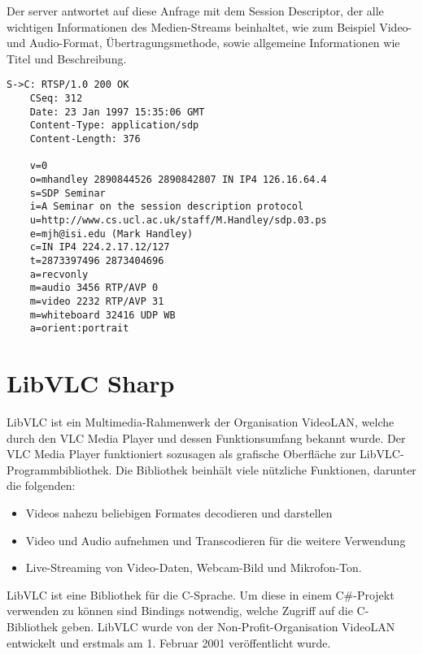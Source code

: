 Der server antwortet auf diese Anfrage mit dem Session Descriptor, der alle wichtigen Informationen des Medien-Streams beinhaltet, wie zum Beispiel Video- und Audio-Format, Übertragungsmethode, sowie allgemeine Informationen wie Titel und Beschreibung.
\begin{lstlisting}
S->C: RTSP/1.0 200 OK
    CSeq: 312
    Date: 23 Jan 1997 15:35:06 GMT
    Content-Type: application/sdp
    Content-Length: 376

    v=0
    o=mhandley 2890844526 2890842807 IN IP4 126.16.64.4
    s=SDP Seminar
    i=A Seminar on the session description protocol
    u=http://www.cs.ucl.ac.uk/staff/M.Handley/sdp.03.ps
    e=mjh@isi.edu (Mark Handley)
    c=IN IP4 224.2.17.12/127
    t=2873397496 2873404696
    a=recvonly
    m=audio 3456 RTP/AVP 0
    m=video 2232 RTP/AVP 31
    m=whiteboard 32416 UDP WB
    a=orient:portrait
\end{lstlisting}

\section{LibVLC Sharp}

LibVLC ist ein Multimedia-Rahmenwerk der Organisation VideoLAN, welche durch den VLC Media Player und dessen Funktionsumfang bekannt wurde. Der VLC Media Player funktioniert sozusagen als grafische Oberfläche zur LibVLC-Programmbibliothek.
Die Bibliothek beinhält viele nützliche Funktionen, darunter die folgenden:
\begin{itemize}
    \item Videos nahezu beliebigen Formates decodieren und darstellen
    \item Video und Audio aufnehmen und Transcodieren für die weitere Verwendung
    \item Live-Streaming von Video-Daten, Webcam-Bild und Mikrofon-Ton.
\end{itemize}    
LibVLC ist eine Bibliothek für die C-Sprache. Um diese in einem C\#-Projekt verwenden zu können sind Bindings notwendig, welche Zugriff auf die C-Bibliothek geben.
LibVLC wurde von der Non-Profit-Organisation VideoLAN entwickelt und erstmals am 1. Februar 2001 veröffentlicht wurde.\cite{libvlc-release}\par

